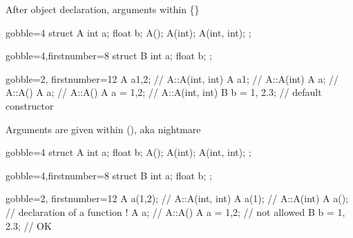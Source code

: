 \begin{frame}[fragile]
  \begin{block}{After object declaration, arguments within \{\}}
    \begin{multicols}{2}
      \begin{cppcode*}{gobble=4}
        struct A {
          int a;
          float b;
          A();
          A(int);
          A(int, int);
        };
      \end{cppcode*}
      \columnbreak
      \begin{cppcode*}{gobble=4,firstnumber=8}
        struct B {
          int a;
          float b;
        };
      \end{cppcode*}
    \end{multicols}
    \begin{cppcode*}{gobble=2, firstnumber=12}
      A a{1,2};       // A::A(int, int)
      A a{1};         // A::A(int)
      A a{};          // A::A()
      A a;            // A::A()
      A a = {1,2};    // A::A(int, int)
      B b = {1, 2.3}; // default constructor
    \end{cppcode*}
  \end{block}
\end{frame}

\begin{frame}[fragile]
  \begin{block}{Arguments are given within (), aka  nightmare}
    \begin{multicols}{2}
      \begin{cppcode*}{gobble=4}
        struct A {
          int a;
          float b;
          A();
          A(int);
          A(int, int);
        };
      \end{cppcode*}
      \columnbreak
      \begin{cppcode*}{gobble=4,firstnumber=8}
        struct B {
          int a;
          float b;
        };
      \end{cppcode*}
    \end{multicols}
    \begin{cppcode*}{gobble=2, firstnumber=12}
      A a(1,2);       // A::A(int, int)
      A a(1);         // A::A(int)
      A a();          // declaration of a function !
      A a;            // A::A()
      A a = {1,2};    // not allowed
      B b = {1, 2.3}; // OK
    \end{cppcode*}
  \end{block}
\end{frame}

